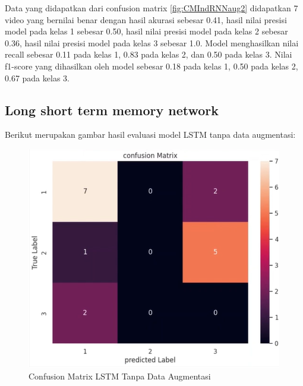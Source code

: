 Data yang didapatkan dari confusion matrix \ref{fig:CMIndRNNaug2} didapatkan 7 video yang bernilai benar
dengan hasil akurasi sebesar 0.41, hasil nilai presisi model pada kelas 1 sebesar 0.50, hasil nilai
presisi model pada kelas 2 sebesar 0.36, hasil nilai presisi model pada kelas 3 sebesar 1.0. Model menghasilkan
nilai recall sebesar 0.11 pada kelas 1, 0.83 pada kelas 2, dan 0.50 pada kelas 3. Nilai f1-score yang dihasilkan
oleh model sebesar 0.18 pada kelas 1, 0.50 pada kelas 2, 0.67 pada kelas 3.

\subsection{Long short term memory network}

Berikut merupakan gambar hasil evaluasi model LSTM tanpa data augmentasi:
\newpage
\begin{figure} [H] \centering
  \includegraphics[scale=1.3]{gambar/CMLSTMnoAug2.png}
  \caption{Confusion Matrix LSTM Tanpa Data Augmentasi}
  \label{fig:CMLSTMnoaug2}
\end{figure}

